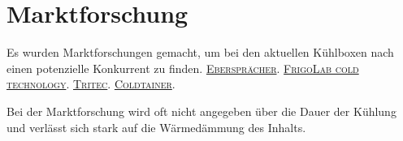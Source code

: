 \chapter{Marktforschung}
Es wurden Marktforschungen gemacht, um bei den aktuellen Kühlboxen nach einen potenzielle Konkurrent zu finden.
\href{https://www.eberspaecher-klima.de/fileadmin/data/corporatesite/pdf/de/4_air_conditioning/gp/fh_gp_kuehlcontainer_de.pdf}{\textsc{Ebersprächer}}.
\newpage
\href{https://www.frigolab.eu/gb/dometic-portable-freezers/67-icy-20.html#/47-normal_or_heated_refrigerator-heated_18c40c}{\textsc{FrigoLab cold technology}}.
\newpage
\href{https://www.tritec-klima.de/datenblaetter/de/kaelte/portable/TD-TC702.pdf}{\textsc{Tritec}}.
\newpage
\href{https://coldtainerusa.com/wp-content/uploads/2020/03/Product_Info_T0022-T0032_US_ColdtainerUSA-1.pdf}{\textsc{Coldtainer}}.
\newpage

Bei der Marktforschung wird oft nicht angegeben über die Dauer der Kühlung und verlässt sich stark auf die Wärmedämmung des Inhalts.

